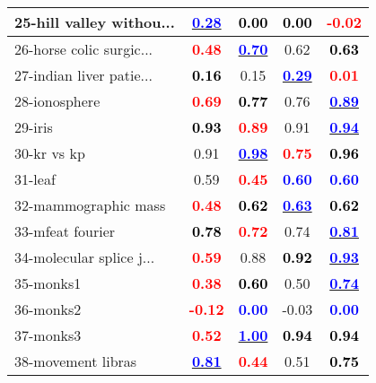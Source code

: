\begin{table}
\begin{center}
\begin{tabular}{lc|c|c|c}
25-hill valley withou... & \underline{\textcolor{blue}{\textbf{  0.28}}} & \textcolor{black}{\textbf{  0.00}} & \textcolor{black}{\textbf{  0.00}} & \textcolor{red}{\textbf{ -0.02}} \\ \hline
26-horse colic surgic... & \textcolor{red}{\textbf{  0.48}} & \underline{\textcolor{blue}{\textbf{  0.70}}} &   0.62 & \textcolor{black}{\textbf{  0.63}} \\
27-indian liver patie... & \textcolor{black}{\textbf{  0.16}} &   0.15 & \underline{\textcolor{blue}{\textbf{  0.29}}} & \textcolor{red}{\textbf{  0.01}} \\
28-ionosphere & \textcolor{red}{\textbf{  0.69}} & \textcolor{black}{\textbf{  0.77}} &   0.76 & \underline{\textcolor{blue}{\textbf{  0.89}}} \\
29-iris & \textcolor{black}{\textbf{  0.93}} & \textcolor{red}{\textbf{  0.89}} &   0.91 & \underline{\textcolor{blue}{\textbf{  0.94}}} \\
30-kr vs kp &   0.91 & \underline{\textcolor{blue}{\textbf{  0.98}}} & \textcolor{red}{\textbf{  0.75}} & \textcolor{black}{\textbf{  0.96}} \\ \hline
31-leaf &   0.59 & \textcolor{red}{\textbf{  0.45}} & \textcolor{blue}{\textbf{  0.60}} & \textcolor{blue}{\textbf{  0.60}} \\
32-mammographic mass & \textcolor{red}{\textbf{  0.48}} & \textcolor{black}{\textbf{  0.62}} & \underline{\textcolor{blue}{\textbf{  0.63}}} & \textcolor{black}{\textbf{  0.62}} \\
33-mfeat fourier & \textcolor{black}{\textbf{  0.78}} & \textcolor{red}{\textbf{  0.72}} &   0.74 & \underline{\textcolor{blue}{\textbf{  0.81}}} \\
34-molecular splice j... & \textcolor{red}{\textbf{  0.59}} &   0.88 & \textcolor{black}{\textbf{  0.92}} & \underline{\textcolor{blue}{\textbf{  0.93}}} \\
35-monks1 & \textcolor{red}{\textbf{  0.38}} & \textcolor{black}{\textbf{  0.60}} &   0.50 & \underline{\textcolor{blue}{\textbf{  0.74}}} \\ \hline
36-monks2 & \textcolor{red}{\textbf{ -0.12}} & \textcolor{blue}{\textbf{  0.00}} &  -0.03 & \textcolor{blue}{\textbf{  0.00}} \\
37-monks3 & \textcolor{red}{\textbf{  0.52}} & \underline{\textcolor{blue}{\textbf{  1.00}}} & \textcolor{black}{\textbf{  0.94}} & \textcolor{black}{\textbf{  0.94}} \\
38-movement libras & \underline{\textcolor{blue}{\textbf{  0.81}}} & \textcolor{red}{\textbf{  0.44}} &   0.51 & \textcolor{black}{\textbf{  0.75}} \\

\end{tabular}
\end{center}
\end{table}
